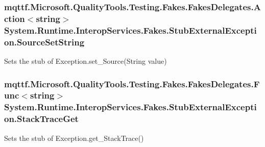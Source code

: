 \hypertarget{class_system_1_1_runtime_1_1_interop_services_1_1_fakes_1_1_stub_external_exception_a97a0bdcf4a9c70f45f3982bfd46cae89}{
\subsubsection[{Source\-Set\-String}]{\setlength{\rightskip}{0pt plus 5cm}mqttf.\-Microsoft.\-Quality\-Tools.\-Testing.\-Fakes.\-Fakes\-Delegates.\-Action$<$string$>$ System.\-Runtime.\-Interop\-Services.\-Fakes.\-Stub\-External\-Exception.\-Source\-Set\-String}}\label{class_system_1_1_runtime_1_1_interop_services_1_1_fakes_1_1_stub_external_exception_a97a0bdcf4a9c70f45f3982bfd46cae89}


Sets the stub of Exception.\-set\-\_\-\-Source(\-String value)

\hypertarget{class_system_1_1_runtime_1_1_interop_services_1_1_fakes_1_1_stub_external_exception_a94bcaac0efa91f7fa6357669f9ab611f}{
\subsubsection[{Stack\-Trace\-Get}]{\setlength{\rightskip}{0pt plus 5cm}mqttf.\-Microsoft.\-Quality\-Tools.\-Testing.\-Fakes.\-Fakes\-Delegates.\-Func$<$string$>$ System.\-Runtime.\-Interop\-Services.\-Fakes.\-Stub\-External\-Exception.\-Stack\-Trace\-Get}}\label{class_system_1_1_runtime_1_1_interop_services_1_1_fakes_1_1_stub_external_exception_a94bcaac0efa91f7fa6357669f9ab611f}


Sets the stub of Exception.\-get\-\_\-\-Stack\-Trace()

